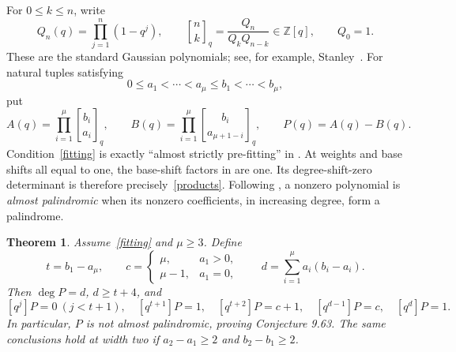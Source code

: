 \documentclass[11pt,a4paper]{article}
\newcommand{\qbin}[2]{\genfrac{[}{]}{0pt}{}{#1}{#2}_{q}}
\newcommand{\coeff}[2]{[q^{#1}]#2}
\newtheorem{theorem}{Theorem}
\begin{document}
For $0\le k\le n$, write
\[
 Q_n(q)=\prod_{j=1}^{n}(1-q^j),\qquad
 \qbin{n}{k}=\frac{Q_n}{Q_kQ_{n-k}}\in\mathbb Z[q],\qquad Q_0=1.
\]
These are the standard Gaussian polynomials; see, for example,
Stanley~\cite[p.~501, equations (2)--(3)]{stanley}.
For natural tuples satisfying
\begin{equation}\label{fitting}
 0\le a_1<\cdots<a_\mu\le b_1<\cdots<b_\mu,
\end{equation}
put
\begin{equation}\label{products}
 A(q)=\prod_{i=1}^{\mu}\qbin{b_i}{a_i},\qquad
 B(q)=\prod_{i=1}^{\mu}\qbin{b_i}{a_{\mu+1-i}},\qquad P(q)=A(q)-B(q).
\end{equation}
Condition~\eqref{fitting} is exactly ``almost strictly pre-fitting'' in
\cite[Definition 9.48(2)]{okada}. At weights and base shifts all equal to
one, the base-shift factors in \cite[Definition 9.4]{okada} are one.
Its degree-shift-zero determinant is therefore precisely~\eqref{products}.
Following \cite[Definition 9.52]{okada}, a nonzero polynomial is
\emph{almost palindromic} when its nonzero coefficients, in increasing
degree, form a palindrome.

\begin{theorem}\label{main}
Assume~\eqref{fitting} and $\mu\ge3$. Define
\[
 t=b_1-a_\mu,\qquad
 c=\begin{cases}\mu,&a_1>0,\\ \mu-1,&a_1=0,\end{cases}
 \qquad d=\sum_{i=1}^{\mu}a_i(b_i-a_i).
\]
Then $\deg P=d$, $d\ge t+4$, and
\begin{equation}\label{endpoints}
 \coeff{j}{P}=0\ (j<t+1),\quad
 \coeff{t+1}{P}=1,\quad \coeff{t+2}{P}=c+1,\quad
 \coeff{d-1}{P}=c,\quad \coeff{d}{P}=1.
\end{equation}
In particular, $P$ is not almost palindromic, proving Conjecture 9.63.
The same conclusions hold at width two if
$a_2-a_1\ge2$ and $b_2-b_1\ge2$.
\end{theorem}
\end{document}
